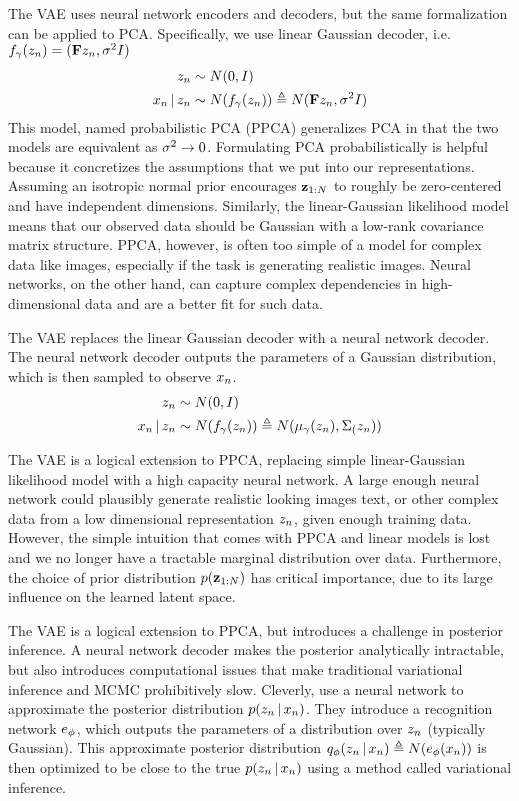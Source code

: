 The VAE uses
neural network encoders and decoders,
but the same formalization
can be applied to PCA.
Specifically, we
use linear Gaussian decoder,
i.e. $f_\gamma(z_n) = (\mathbf{F} z_n, \sigma^2 I)$
\begin{align*}
    z_n &\sim N(0, I) \\
    x_n \,|\, z_n &\sim N(f_\gamma(z_n)) \triangleq N(\mathbf{F} z_n, \sigma^2 I)
\end{align*}
This model, named probabilistic PCA (PPCA)
generalizes PCA in that the two models
are equivalent as $\sigma^2 \rightarrow 0$.
Formulating PCA probabilistically
is helpful because it concretizes
the assumptions that we
put into our representations.
Assuming an isotropic normal
prior encourages $\mathbf{z}_{1:N}$
to roughly be zero-centered and
have independent dimensions.
Similarly, the linear-Gaussian
likelihood model means
that our observed data
should be Gaussian with
a low-rank covariance matrix structure.
PPCA, however, is often too simple
of a model for complex data like images,
especially if the task is generating
realistic images. Neural networks, on
the other hand, can capture complex
dependencies in high-dimensional
data and are a better fit
for such data. 

The VAE replaces the linear Gaussian
decoder with a neural
network decoder.
The neural network decoder outputs
the parameters of a Gaussian distribution,
which is then sampled to observe $x_n$.
\begin{align*}
    z_n &\sim N(0, I) \\
    x_n \,|\, z_n &\sim N(f_\gamma(z_n)) \triangleq N(\mu_\gamma(z_n), \Sigma_(z_n))
\end{align*}

The VAE is a logical extension to PPCA,
replacing simple linear-Gaussian
likelihood model with a high capacity
neural network. A large enough 
neural network could plausibly
generate realistic looking images
 text, or other complex data
from a low dimensional representation $z_n$,
given enough training data.
However, the simple intuition that comes
with PPCA and linear models 
is lost and we no longer
have a tractable marginal distribution over data.
Furthermore, the choice of prior
distribution $p(\mathbf{z}_{1:N})$ has critical importance,
due to its large influence on the learned latent space.

The VAE is a logical extension to PPCA, but
introduces a challenge in posterior inference.
A neural network decoder makes the posterior
analytically intractable, but also
introduces computational issues that make traditional
variational inference and MCMC prohibitively slow.
Cleverly, \cite{Kingma2014} use a
neural network to approximate the posterior distribution
$p(z_n \,|\, x_n)$. They introduce
a recognition network $e_\phi$,
which outputs the parameters of a distribution
over $z_n$ (typically Gaussian). This
approximate posterior distribution $q_\phi(z_n \,|\, x_n) \triangleq N(e_\phi(x_n))$ is then optimized to be 
close to the true $p(z_n \,|\, x_n)$
using a method called variational inference.

